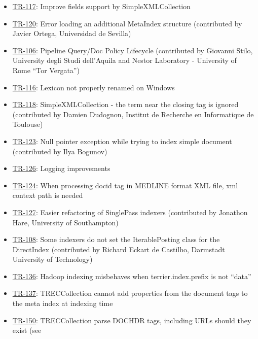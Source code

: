 \begin{itemize}
\tightlist
\item
  \href{http://terrier.org/issues/browse/TR-117}{TR-117}: Improve fields
  support by SimpleXMLCollection
\item
  \href{http://terrier.org/issues/browse/TR-120}{TR-120}: Error loading
  an additional MetaIndex structure (contributed by Javier Ortega,
  Universidad de Sevilla)
\item
  \href{http://terrier.org/issues/browse/TR-106}{TR-106}: Pipeline
  Query/Doc Policy Lifecycle (contributed by Giovanni Stilo, University
  degli Studi dell'Aquila and Nestor Laboratory - University of Rome
  ``Tor Vergata'')
\item
  \href{http://terrier.org/issues/browse/TR-110}{TR-116}: Lexicon not
  properly renamed on Windows
\item
  \href{http://terrier.org/issues/browse/TR-118}{TR-118}:
  SimpleXMLCollection - the term near the closing tag is ignored
  (contributed by Damien Dudognon, Institut de Recherche en Informatique
  de Toulouse)
\item
  \href{http://terrier.org/issues/browse/TR-123}{TR-123}: Null pointer
  exception while trying to index simple document (contributed by Ilya
  Bogunov)
\item
  \href{http://terrier.org/issues/browse/TR-123}{TR-126}: Logging
  improvements
\item
  \href{http://terrier.org/issues/browse/TR-123}{TR-124}: When
  processing docid tag in MEDLINE format XML file, xml context path is
  needed
\item
  \href{http://terrier.org/issues/browse/TR-127}{TR-127}: Easier
  refactoring of SinglePass indexers (contributed by Jonathon Hare,
  University of Southampton)
\item
  \href{http://terrier.org/issues/browse/TR-108}{TR-108}: Some indexers
  do not set the IterablePosting class for the DirectIndex (contributed
  by Richard Eckart de Castilho, Darmstadt University of Technology)
\item
  \href{http://terrier.org/issues/browse/TR-136}{TR-136}: Hadoop
  indexing misbehaves when terrier.index.prefix is not ``data''
\item
  \href{http://terrier.org/issues/browse/TR-137}{TR-137}: TRECCollection
  cannot add properties from the document tags to the meta index at
  indexing time
\item
  \href{http://terrier.org/issues/browse/TR-150}{TR-150}: TRECCollection
  parse DOCHDR tags, including URLs should they exist (see

\end{itemize}
